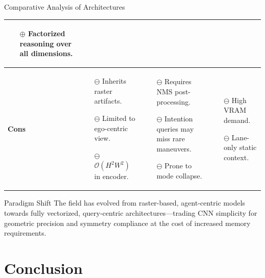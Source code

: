 \documentclass[10pt,aspectratio=169]{beamer}
\newcommand{\greenoplus}{\textcolor{mygreen}{\( \oplus \)}}
\newcommand{\redominus}{\textcolor{myred}{\( \ominus \)}}
\begin{document}
\begin{frame}{Comparative Analysis of Architectures}
\begin{table}[ht]
\begin{tabular}{|p{1.9cm}|p{3.9cm}|p{3.9cm}|p{3.9cm}|}
\begin{itemize}
        \item[\greenoplus] Factorized reasoning over all dimensions.
    \end{itemize} \\
    \hline
    \textbf{Cons} &
    \begin{itemize}
        \item[\redominus] Inherits raster artifacts.
        \item[\redominus] Limited to ego-centric view.
        \item[\redominus] \( \mathcal{O}(H^2 W^2) \) in encoder.
    \end{itemize} &
    \begin{itemize}
        \item[\redominus] Requires NMS post-processing.
        \item[\redominus] Intention queries may miss rare maneuvers.
        \item[\redominus] Prone to mode collapse.
    \end{itemize} &
    \begin{itemize}
        \item[\redominus] High VRAM demand.
        \item[\redominus] Lane-only static context.
    \end{itemize} \\
    \hline
\end{tabular}
\end{table}
\begin{block}{Paradigm Shift}
    The field has evolved from raster-based, agent-centric models towards fully vectorized, query-centric architectures—trading CNN simplicity for geometric precision and symmetry compliance at the cost of increased memory requirements.
\end{block}
\end{frame}

\section{Conclusion}
\end{document}

